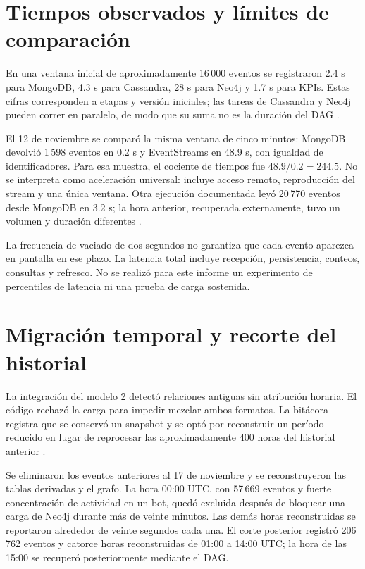 \section{Tiempos observados y límites de comparación}
En una ventana inicial de aproximadamente 16\,000 eventos se registraron 2.4 s para MongoDB, 4.3 s para Cassandra, 28 s para Neo4j y 1.7 s para KPIs. Estas cifras corresponden a etapas y versión iniciales; las tareas de Cassandra y Neo4j pueden correr en paralelo, de modo que su suma no es la duración del DAG \cite{bitacora}.

El 12 de noviembre se comparó la misma ventana de cinco minutos: MongoDB devolvió 1\,598 eventos en 0.2 s y EventStreams en 48.9 s, con igualdad de identificadores. Para esa muestra, el cociente de tiempos fue $48.9/0.2=244.5$. No se interpreta como aceleración universal: incluye acceso remoto, reproducción del stream y una única ventana. Otra ejecución documentada leyó 20\,770 eventos desde MongoDB en 3.2 s; la hora anterior, recuperada externamente, tuvo un volumen y duración diferentes \cite{bitacora}.

La frecuencia de vaciado de dos segundos no garantiza que cada evento aparezca en pantalla en ese plazo. La latencia total incluye recepción, persistencia, conteos, consultas y refresco. No se realizó para este informe un experimento de percentiles de latencia ni una prueba de carga sostenida.

\section{Migración temporal y recorte del historial}
La integración del modelo 2 detectó relaciones antiguas sin atribución horaria. El código rechazó la carga para impedir mezclar ambos formatos. La bitácora registra que se conservó un snapshot y se optó por reconstruir un período reducido en lugar de reprocesar las aproximadamente 400 horas del historial anterior \cite{bitacora}.

Se eliminaron los eventos anteriores al 17 de noviembre y se reconstruyeron las tablas derivadas y el grafo. La hora 00:00 UTC, con 57\,669 eventos y fuerte concentración de actividad en un bot, quedó excluida después de bloquear una carga de Neo4j durante más de veinte minutos. Las demás horas reconstruidas se reportaron alrededor de veinte segundos cada una. El corte posterior registró 206\,762 eventos y catorce horas reconstruidas de 01:00 a 14:00 UTC; la hora de las 15:00 se recuperó posteriormente mediante el DAG.

